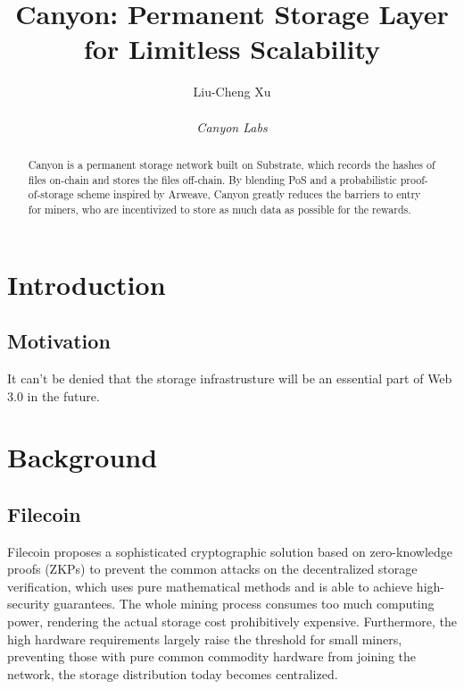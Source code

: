 \documentclass[]{article}
\title{Canyon: Permanent Storage Layer for Limitless Scalability}
\author{
    Liu-Cheng Xu\\
    \\
    \textit{Canyon Labs}
}
\date{}
\begin{document}
\maketitle

\begin{abstract}

Canyon is a permanent storage network built on Substrate, which records the hashes of files on-chain and stores the files off-chain. By blending PoS and a probabilistic proof-of-storage scheme inspired by Arweave, Canyon greatly reduces the barriers to entry for miners, who are incentivized to store as much data as possible for the rewards.

\end{abstract}

\tableofcontents

\newpage

\section{Introduction}

\subsection{Motivation}

It can't be denied that the storage infrastrusture will be an essential part of Web 3.0 in the future.



\section{Background}

\subsection{Filecoin}

Filecoin\cite{ref1} proposes a sophisticated cryptographic solution based on zero-knowledge proofs (ZKPs) to prevent the common attacks on the decentralized storage verification, which uses pure mathematical methods and is able to achieve high-security guarantees. The whole mining process consumes too much computing power, rendering the actual storage cost prohibitively expensive. Furthermore, the high hardware requirements largely raise the threshold for small miners, preventing those with pure common commodity hardware from joining the network, the storage distribution today becomes centralized.
\end{document}
